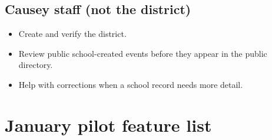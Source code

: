 \documentclass[11pt]{article}
\begin{document}
\subsection*{Causey staff (not the district)}
\begin{itemize}
  \item Create and verify the district.
  \item Review public school-created events before they appear in the public directory.
  \item Help with corrections when a school record needs more detail.
\end{itemize}

\section*{January pilot feature list}
\end{document}
